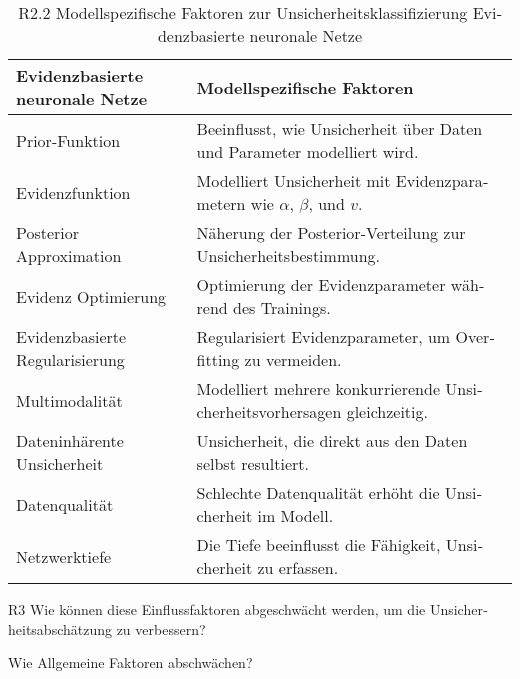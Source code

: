 \begin{otherlanguage}{ngerman}
\begin{table}[!htpb]
  \centering
  \begin{tabularx}{\textwidth}{|l|X|}
    \hline
    \textbf{\gls{Evidenzbasierte neuronale Netze}} & \textbf{Modellspezifische Faktoren} \\
    \hline
    Prior-Funktion & Beeinflusst, wie Unsicherheit über Daten und Parameter modelliert wird. \\
    \hline
    Evidenzfunktion & Modelliert Unsicherheit mit Evidenzparametern wie \( \alpha \), \( \beta \), und \( v \). \\
    \hline
    Posterior Approximation & Näherung der Posterior-Verteilung zur Unsicherheitsbestimmung. \\
    \hline
    Evidenz Optimierung & Optimierung der Evidenzparameter während des Trainings. \\
    \hline
    Evidenzbasierte Regularisierung & Regularisiert Evidenzparameter, um Overfitting zu vermeiden. \\
    \hline
    Multimodalität & Modelliert mehrere konkurrierende Unsicherheitsvorhersagen gleichzeitig. \\
    \hline
    Dateninhärente Unsicherheit & Unsicherheit, die direkt aus den Daten selbst resultiert. \\
    \hline
    Datenqualität & Schlechte Datenqualität erhöht die Unsicherheit im Modell. \\
    \hline
    Netzwerktiefe & Die Tiefe beeinflusst die Fähigkeit, Unsicherheit zu erfassen. \\
    \hline
  \end{tabularx}
  \caption{R2.2 Modellspezifische Faktoren zur Unsicherheitsklassifizierung \gls{Evidenzbasierte neuronale Netze}}\label{tab:chapter6r23}
\end{table}

\newpage


R3 Wie können diese Einflussfaktoren abgeschwächt werden, um die Unsicherheitsabschätzung zu verbessern?

\newline
Wie Allgemeine Faktoren abschwächen?


\end{otherlanguage}
